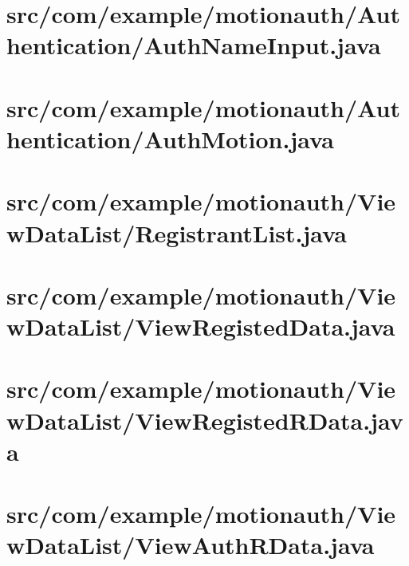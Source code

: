 \documentclass[11pt]{jreport}
\renewcommand{\slash}{/}
\begin{document}
    \section{src\slash com\slash example\slash motionauth\slash Authentication\slash AuthNameInput.java}
    

    \section{src\slash com\slash example\slash motionauth\slash Authentication\slash AuthMotion.java}
    

    \section{src\slash com\slash example\slash motionauth\slash ViewDataList\slash RegistrantList.java}
    

    \section{src\slash com\slash example\slash motionauth\slash ViewDataList\slash ViewRegistedData.java}
    

    \section{src\slash com\slash example\slash motionauth\slash ViewDataList\slash ViewRegistedRData.java}
    

    \section{src\slash com\slash example\slash motionauth\slash ViewDataList\slash ViewAuthRData.java}
    
\end{document}
